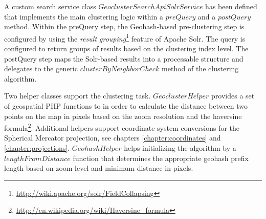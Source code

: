 \begin{itemize}
A custom search service class $GeoclusterSearchApiSolrService$ has been defined that implements the main clustering logic within a $preQuery$ and a $postQuery$ method. Within the preQuery step, the Geohash-based pre-clustering step is configured by using the \textit{result grouping}\footnote{\url{http://wiki.apache.org/solr/FieldCollapsing}} feature of Apache Solr. The query is configured to return groups of results based on the clustering index level. The postQuery step maps the Solr-based results into a processable structure and delegates to the generic $clusterByNeighborCheck$ method of the clustering algorithm.

\end{itemize}

Two helper classes support the clustering task. $GeoclusterHelper$ provides a set of geospatial PHP functions to in order to calculate the distance between two points on the map in pixels based on the zoom resolution and the haversine formula\footnote{\url{http://en.wikipedia.org/wiki/Haversine_formula}}. Additional helpers support coordinate system conversions for the Spherical Mercator projection, see chapters \ref{chapter:coordinates} and \ref{chapter:projections}. $GeohashHelper$ helps initializing the algorithm by a $lengthFromDistance$ function that determines the appropriate geohash prefix length based on zoom level and minimum distance in pixels.



